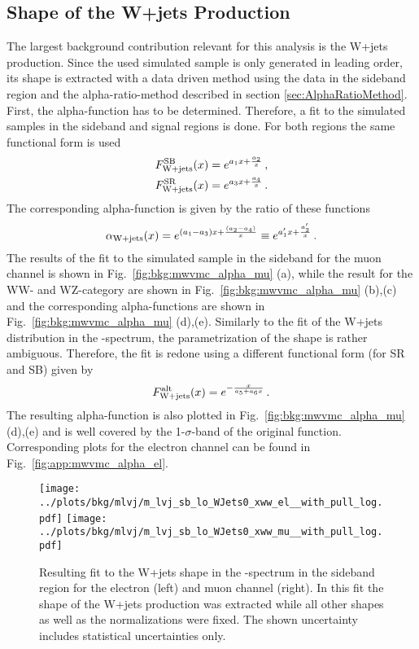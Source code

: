\subsection{Shape of the W+jets Production}
\label{sec:shapewjets}
The largest background contribution relevant for this analysis is the W+jets production. Since the used simulated sample is only generated in leading order, its shape is extracted with a data driven method using the data in the sideband region and the alpha-ratio-method described in section \ref{sec:AlphaRatioMethod}. First, the alpha-function has to be determined. Therefore, a fit to the simulated samples in the sideband and signal regions is done. For both regions the same functional form is used
\begin{align}
F_{\rm W+jets}^{\rm SB}(x)=e^{a_1x+\frac{a_2}{x}} \, , \\
F_{\rm W+jets}^{\rm SR}(x)=e^{a_3x+\frac{a_4}{x}} \, . \label{eq:bkg:wjetssig}
\end{align}
The corresponding alpha-function is given by the ratio of these functions
\begin{equation}
\alpha_{\rm W+jets}(x) = e^{(a_1-a_3)x+\frac{(a_2-a_4)}{x}} \equiv e^{a_1'x+\frac{a_2'}{x}} \, .
\end{equation}
The results of the fit to the simulated sample in the sideband for the muon channel is shown in Fig.~\ref{fig:bkg:mwvmc_alpha_mu} (a), while the result for the WW- and WZ-category are shown in Fig.~\ref{fig:bkg:mwvmc_alpha_mu} (b),(c) and the corresponding alpha-functions are shown in Fig.~\ref{fig:bkg:mwvmc_alpha_mu} (d),(e). Similarly to the fit of the W+jets distribution in the \Mpr -spectrum, the parametrization of the shape is rather ambiguous. Therefore, the fit is redone using a different functional form (for SR and SB) given by
\begin{equation}
F_{\rm W+jets}^{\rm alt}(x)=e^{-\frac{x}{a_5+a_6x}} \, .
\label{eq:bkg:altfunc}
\end{equation}
The resulting alpha-function is also plotted in Fig.~\ref{fig:bkg:mwvmc_alpha_mu} (d),(e) and is well covered by the 1-$\sigma$-band of the original function. Corresponding plots for the electron channel can be found in Fig.~\ref{fig:app:mwvmc_alpha_el}.\\
\begin{figure}
	\centering
	\texttt{[image: ../plots/bkg/mlvj/m\_lvj\_sb\_lo\_WJets0\_xww\_el\_\_with\_pull\_log.pdf]}
	\texttt{[image: ../plots/bkg/mlvj/m\_lvj\_sb\_lo\_WJets0\_xww\_mu\_\_with\_pull\_log.pdf]}
	\caption[Resulting fit to the W+jets shape in the \MWV -spectrum in the sideband region]{Resulting fit to the W+jets shape in the \MWV -spectrum in the sideband region for the electron (left) and muon channel (right). In this fit the shape of the W+jets production was extracted while all other shapes as well as the normalizations were fixed. The shown uncertainty includes statistical uncertainties only.}	
	\label{fig:bkg:data_sb}
\end{figure}
